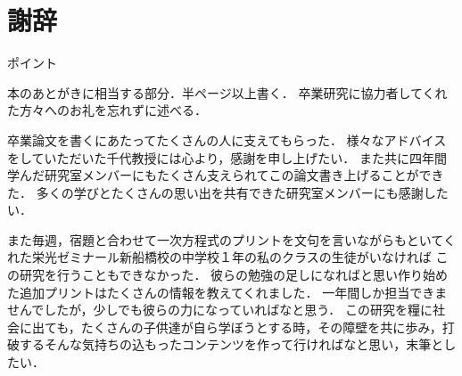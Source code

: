 \documentclass[a4j,11pt,report]{jsbook}
\newcommand{\point}[1]{
\begin{itembox}[l]{ポイント}
  #1
\end{itembox}
}
\begin{document}
\chapter*{謝辞 \label{ch:acknowledgement}}
\thispagestyle{empty}
\point{
本のあとがきに相当する部分．半ページ以上書く．
卒業研究に協力者してくれた方々へのお礼を忘れずに述べる．
}

卒業論文を書くにあたってたくさんの人に支えてもらった．
様々なアドバイスをしていただいた千代教授には心より，感謝を申し上げたい．
また共に四年間学んだ研究室メンバーにもたくさん支えられてこの論文書き上げることができた．
多くの学びとたくさんの思い出を共有できた研究室メンバーにも感謝したい．

また毎週，宿題と合わせて一次方程式のプリントを文句を言いながらもといてくれた栄光ゼミナール新船橋校の中学校１年の私のクラスの生徒がいなければ
この研究を行うこともできなかった．
彼らの勉強の足しになればと思い作り始めた追加プリントはたくさんの情報を教えてくれました．
一年間しか担当できませんでしたが，少しでも彼らの力になっていればなと思う．
この研究を糧に社会に出ても，たくさんの子供達が自ら学ぼうとする時，その障壁を共に歩み，打破するそんな気持ちの込もったコンテンツを作って行ければなと思い，末筆としたい．
\end{document}
